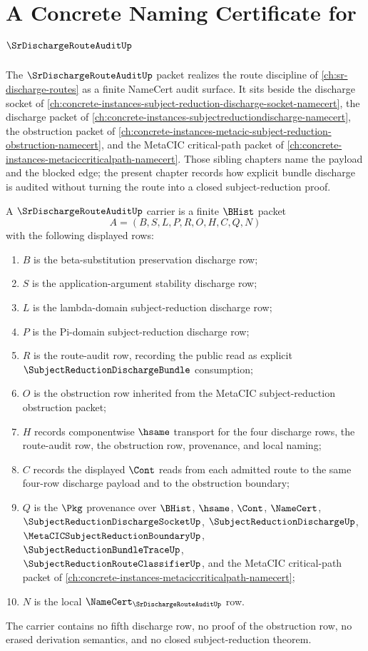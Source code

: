 \chapter{A Concrete Naming Certificate for $\SrDischargeRouteAuditUp$}
\label{ch:concrete-instances-srdischargerouteaudit-namecert}

The $\SrDischargeRouteAuditUp$ packet realizes the route discipline of \autoref{ch:sr-discharge-routes} as a finite NameCert audit surface. It sits beside the discharge socket of \autoref{ch:concrete-instances-subject-reduction-discharge-socket-namecert}, the discharge packet of \autoref{ch:concrete-instances-subjectreductiondischarge-namecert}, the obstruction packet of \autoref{ch:concrete-instances-metacic-subject-reduction-obstruction-namecert}, and the MetaCIC critical-path packet of \autoref{ch:concrete-instances-metaciccriticalpath-namecert}. Those sibling chapters name the payload and the blocked edge; the present chapter records how explicit bundle discharge is audited without turning the route into a closed subject-reduction proof.

\begin{definition}
\label{def:sr-discharge-route-audit-carrier}
A $\SrDischargeRouteAuditUp$ carrier is a finite $\BHist$ packet
$$
A=(B,S,L,P,R,O,H,C,Q,N)
$$
with the following displayed rows:
\begin{enumerate}
\item $B$ is the beta-substitution preservation discharge row;
\item $S$ is the application-argument stability discharge row;
\item $L$ is the lambda-domain subject-reduction discharge row;
\item $P$ is the Pi-domain subject-reduction discharge row;
\item $R$ is the route-audit row, recording the public read as explicit $\SubjectReductionDischargeBundle$ consumption;
\item $O$ is the obstruction row inherited from the MetaCIC subject-reduction obstruction packet;
\item $H$ records componentwise $\hsame$ transport for the four discharge rows, the route-audit row, the obstruction row, provenance, and local naming;
\item $C$ records the displayed $\Cont$ reads from each admitted route to the same four-row discharge payload and to the obstruction boundary;
\item $Q$ is the $\Pkg$ provenance over $\BHist$, $\hsame$, $\Cont$, $\NameCert$, $\SubjectReductionDischargeSocketUp$, $\SubjectReductionDischargeUp$, $\MetaCICSubjectReductionBoundaryUp$, $\SubjectReductionBundleTraceUp$, $\SubjectReductionRouteClassifierUp$, and the MetaCIC critical-path packet of \autoref{ch:concrete-instances-metaciccriticalpath-namecert};
\item $N$ is the local $\NameCert_{\SrDischargeRouteAuditUp}$ row.
\end{enumerate}
The carrier contains no fifth discharge row, no proof of the obstruction row, no erased derivation semantics, and no closed subject-reduction theorem.
\end{definition}

